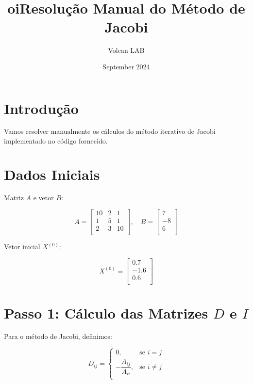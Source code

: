 \documentclass{article}
\title{oi}
\author{Volcan LAB}
\date{September 2024}
\begin{document}
\maketitle



\title{Resolução Manual do Método de Jacobi}
\author{}
\date{}

\maketitle

\section*{Introdução}

Vamos resolver manualmente os cálculos do método iterativo de Jacobi implementado no código fornecido.

\section*{Dados Iniciais}

Matriz $A$ e vetor $B$:

\[
A = \begin{bmatrix}
10 & 2 & 1 \\
1 & 5 & 1 \\
2 & 3 & 10 \\
\end{bmatrix}, \quad
B = \begin{bmatrix}
7 \\
-8 \\
6 \\
\end{bmatrix}
\]

Vetor inicial $X^{(0)}$:

\[
X^{(0)} = \begin{bmatrix}
0.7 \\
-1.6 \\
0.6 \\
\end{bmatrix}
\]

\section*{Passo 1: Cálculo das Matrizes $D$ e $I$}

Para o método de Jacobi, definimos:

\[
D_{ij} = \begin{cases}
0, & \text{se } i = j \\
-\dfrac{A_{ij}}{A_{ii}}, & \text{se } i \neq j \\
\end{cases}
\]
\end{document}
